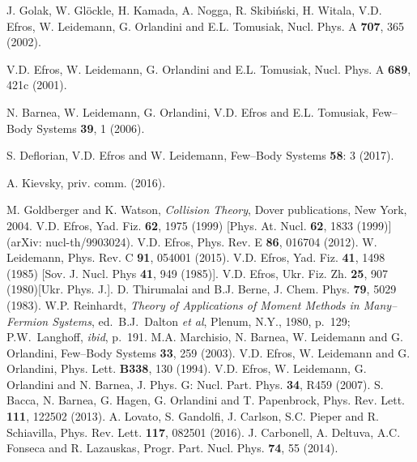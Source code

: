 \documentclass[12pt,ams,preprint,a4paper]{revtex4}
\begin{document}
\begin{thebibliography}{99}

 J. Golak, W.
Gl\"ockle, H. Kamada, A. Nogga,
R. Skibi\'nski, H. Witala, V.D. Efros, W. Leidemann, G. Orlandini
and E.L. Tomusiak, Nucl. Phys. A {\bf 707},  365 (2002). 

 V.D. Efros, W. Leidemann, 
G. Orlandini and E.L. Tomusiak, Nucl. Phys. A {\bf 689}, 421c (2001). 

 N. Barnea, W. Leidemann, G. Orlandini, V.D. Efros
and E.L. Tomusiak, Few--Body Systems {\bf 39}, 1 (2006).

 S. Deflorian,  V.D. Efros  and W. Leidemann, Few--Body Systems {\bf 58}: 3 (2017).

 A. Kievsky, priv. comm. (2016).

 M. Goldberger and K. Watson, {\it Collision Theory}, Dover publications, New York, 2004.
 V.D. Efros, Yad. Fiz.  {\bf 62}, 1975 (1999)  [Phys. At. Nucl. 
{\bf 62},  1833 (1999)] (arXiv: \mbox{nucl-th/9903024}).
 V.D. Efros, Phys. Rev. E {\bf 86},  016704 (2012).
 W. Leidemann, Phys. Rev. C {\bf 91}, 054001 (2015). 
 V.D. Efros, Yad. Fiz. {\bf 41},  1498 (1985) [Sov. J. Nucl. Phys {\bf 41}, 949 (1985)].
 V.D. Efros, Ukr. Fiz. Zh. {\bf 25}, 907 (1980)[Ukr. Phys. J.]. 
 D. Thirumalai and B.J. Berne, J. Chem. Phys. {\bf 79}, 5029 (1983).
W.P. Reinhardt, 
        {\it Theory of Applications of Moment Methods in
        Many--Fermion Systems}, ed.~B.J.~Dalton {\it et al}, Plenum, N.Y., 1980, p.~129;
        P.W.~Langhoff, {\it ibid}, p.~191.
 M.A. Marchisio, N. Barnea, W. Leidemann and G. Orlandini, Few--Body Systems {\bf 33}, 259
(2003).
V.D. Efros, W. Leidemann and G. Orlandini, Phys. Lett. {\bf B338},
130 (1994).
V.D. Efros, W. Leidemann, G. Orlandini and N. Barnea, J. Phys. G: Nucl. Part. Phys. {\bf 34}, R459 (2007).
S. Bacca, N. Barnea, G. Hagen, G. Orlandini and T. Papenbrock, Phys. Rev. Lett. {\bf 111},
122502 (2013).
A. Lovato, S. Gandolfi, J. Carlson, S.C. Pieper and R. Schiavilla, Phys. Rev. Lett. 
{\bf 117}, 082501 (2016).
 J. Carbonell, A. Deltuva, A.C. Fonseca and R. Lazauskas, Progr. Part. Nucl. Phys. 
{\bf 74}, 55 (2014).
\end{thebibliography}
\end{document}
